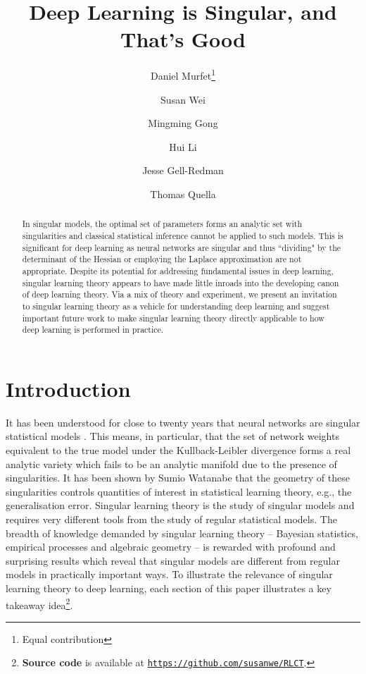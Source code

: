 \documentclass[11pt]{article}
\author{Daniel Murfet\thanks{Equal contribution}}
\author{Susan Wei\samethanks}
\author{Mingming Gong}
\author{Hui Li}
\author{Jesse Gell-Redman}
\author{Thomas Quella}
\affil{School of Mathematics and Statistics \\ University of Melbourne \\ Melbourne, Australia}
\title{Deep Learning is Singular, and That's Good}
\numberwithin{equation}{section}
\theoremstyle{plain}
\theoremstyle{definition}
\begin{document}
\maketitle

\begin{abstract}
	In singular models, the optimal set of parameters forms an analytic set with singularities and classical statistical inference cannot be applied to such models. This is significant for deep learning as neural networks are singular and thus ``dividing" by the determinant of the Hessian or employing the Laplace approximation are not appropriate. Despite its potential for addressing fundamental issues in deep learning, singular learning theory appears to have made little inroads into the developing canon of deep learning theory. Via a mix of theory and experiment, we present an invitation to singular learning theory as a vehicle for understanding deep learning and suggest important future work to make singular learning theory directly applicable to how deep learning is performed in practice. 
\end{abstract}

\section{Introduction}

It has been understood for close to twenty years that neural networks are singular statistical models \citep{amari_learning_2003, watanabe_almost_2007}. This means, in particular, that the set of network weights equivalent to the true model under the Kullback-Leibler divergence forms a real analytic variety which fails to be an analytic manifold due to the presence of singularities. It has been shown by Sumio Watanabe that the geometry of these singularities controls quantities of interest in statistical learning theory, e.g., the generalisation error. Singular learning theory \citep{watanabe_algebraic_2009} is the study of singular models and requires very different tools from the study of regular statistical models. The breadth of knowledge demanded by singular learning theory -- Bayesian statistics, empirical processes and algebraic geometry -- is rewarded with profound and surprising results which reveal that singular models are different from regular models in practically important ways.
To illustrate the relevance of singular learning theory to deep learning, each section of this paper illustrates a key takeaway idea\footnote{\textbf{Source code} is available at \href{https://github.com/susanwe/RLCT}{\texttt{https://github.com/susanwe/RLCT}}.}. 
\end{document}
